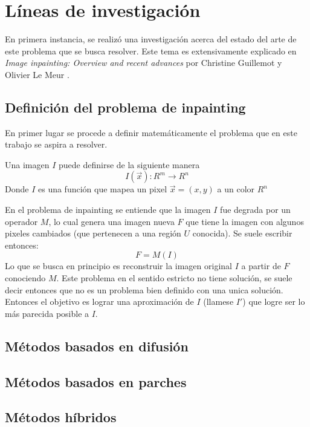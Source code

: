 \documentclass[assd_tpf_main.tex]{subfiles}
\begin{document}
\section{L\'ineas de investigaci\'on}

En primera instancia, se realiz\'o una investigaci\'on acerca 
del estado del arte de este problema que se busca resolver.
Este tema es extensivamente explicado en \textit{Image inpainting: Overview and recent advances} por Christine Guillemot y Olivier Le Meur \cite{b3}.

\subsection{Definici\'on del problema de inpainting}

En primer lugar se procede a definir matemáticamente el problema que en este trabajo se aspira a resolver. 

Una imagen $I$ puede definirse de la siguiente manera
\begin{equation}
I(\vec x): R^{m} \to R^{n}
\end{equation}
Donde $I$ es una función que mapea un pixel $\vec x=(x,y)$ a un color $R^{n}$

En el problema de inpainting se entiende que la imagen $I$ fue degrada por un operador $M$, lo cual genera una imagen nueva $F$ que tiene la imagen con algunos pixeles cambiados (que pertenecen a una región $U$ conocida). Se suele escribir entonces:
\begin{equation}
F=M(I)
\end{equation}
Lo que se busca en principio es reconstruir la imagen original $I$ a partir de $F$ conociendo $M$. Este problema en el sentido estricto no tiene solución, se suele decir entonces que no es un problema bien definido con una unica solución.
Entonces el objetivo es lograr una aproximación de $I$ (llamese $I'$) que logre ser lo más parecida posible a $I$.
\subsection{Métodos basados en difusión}


\subsection{Métodos basados en parches}


\subsection{M\'etodos h\'ibridos}
\end{document}
